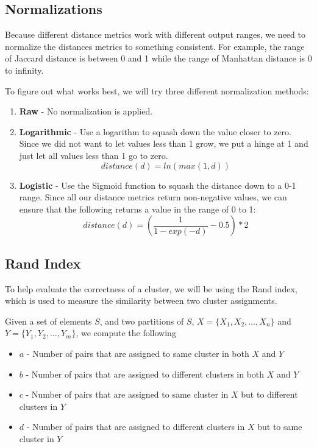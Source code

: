 \documentclass{article}
\begin{document}
   \subsection{Normalizations}
      Because different distance metrics work with different output ranges, we need to normalize the distances metrics to something consistent.
      For example, the range of Jaccard distance is between 0 and 1 while the range of Manhattan distance is 0 to infinity.

      To figure out what works best, we will try three different normalization methods:
      \begin{enumerate}
         \item
            \textbf{Raw} - No normalization is applied.
         
         \item
            \textbf{Logarithmic} - Use a logarithm to squash down the value closer to zero.
            Since we did not want to let values less than 1 grow, we put a hinge at 1 and just let all values less than 1 go to zero.
            $$ distance(d) = ln(max(1, d)) $$
            
         \item
            \textbf{Logistic} - Use the Sigmoid function to squash the distance down to a 0-1 range.
            Since all our distance metrics return non-negative values, we can ensure that the following returns a value in the range of 0 to 1:
            $$ distance(d) = (\frac{1}{1 - exp(-d)} - 0.5) * 2 $$
      \end{enumerate}

   \subsection{Rand Index}
      To help evaluate the correctness of a cluster, we will be using the Rand index, which is used to measure the similarity between two cluster assignments.

      Given a set of elements $S$, and two partitions of $S$, $X = \{ X_1, X_2, \ldots, X_n \}$ and $Y = \{Y_1, Y_2, \ldots, Y_m\}$, we compute the following
      \begin{itemize}
         \item $a$ - Number of pairs that are assigned to same cluster in both $X$ and $Y$
         \item $b$ - Number of pairs that are assigned to different clusters in both $X$ and $Y$
         \item $c$ - Number of pairs that are assigned to same cluster in $X$ but to different clusters in $Y$
         \item $d$ - Number of pairs that are assigned to different clusters in $X$ but to same cluster in $Y$
      \end{itemize}
\end{document}
